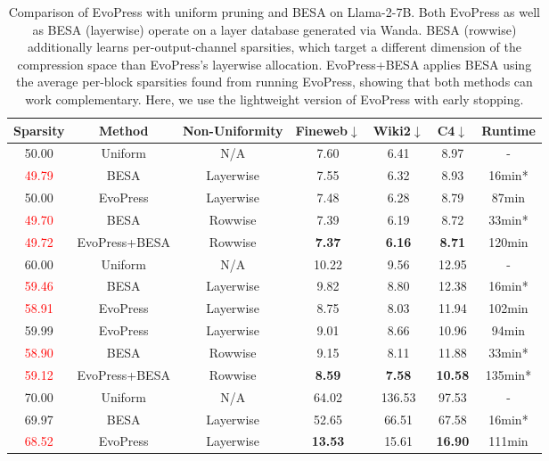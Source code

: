 

\begin{table}[h!]
\centering
\begin{threeparttable}

\caption{Comparison of EvoPress with uniform pruning and BESA on Llama-2-7B. Both EvoPress as well as BESA (layerwise) operate on a layer database generated via Wanda. BESA (rowwise) additionally learns per-output-channel sparsities, which target a different dimension of the compression space than EvoPress's layerwise allocation. EvoPress+BESA applies BESA using the average per-block sparsities found from running EvoPress, showing that both methods can work complementary. Here, we use the lightweight version of EvoPress with early stopping.}
\label{besa_comparison}
\begin{tabular}{ccc|ccc|c}
\toprule
\textbf{Sparsity} & \textbf{Method} & \textbf{Non-Uniformity} & \textbf{Fineweb$\downarrow$} & \textbf{Wiki2$\downarrow$} & \textbf{C4$\downarrow$} & \textbf{Runtime} \\
\midrule
50.00 & Uniform & N/A & 7.60 & 6.41 & 8.97 & - \\
\textcolor{red}{49.79} & BESA & Layerwise & 7.55 & 6.32 & 8.93 & 16min* \\
50.00 & EvoPress & Layerwise & 7.48 & 6.28 & 8.79 & 87min \\
\textcolor{red}{49.70} & BESA & Rowwise & 7.39 & 6.19 & 8.72 & 33min* \\
\textcolor{red}{49.72} & EvoPress+BESA & Rowwise & \textbf{7.37} & \textbf{6.16} & \textbf{8.71} & 120min \\
\midrule
60.00 & Uniform & N/A & 10.22 & 9.56 & 12.95 & - \\
\textcolor{red}{59.46} & BESA & Layerwise & 9.82 & 8.80 & 12.38 & 16min* \\
\textcolor{red}{58.91} & EvoPress & Layerwise & 8.75 & 8.03 & 11.94 & 102min \\
59.99 & EvoPress & Layerwise & 9.01 & 8.66 & 10.96 & 94min \\
\textcolor{red}{58.90} & BESA & Rowwise & 9.15 & 8.11 & 11.88 & 33min* \\
\textcolor{red}{59.12} & EvoPress+BESA & Rowwise & \textbf{8.59} & \textbf{7.58} & \textbf{10.58} & 135min* \\
\midrule
70.00 & Uniform & N/A & 64.02 & 136.53 & 97.53 & - \\
69.97 & BESA & Layerwise & 52.65 & 66.51 & 67.58 & 16min* \\
\textcolor{red}{68.52} & EvoPress & Layerwise & \textbf{13.53} & 15.61 & \textbf{16.90} & 111min \\

\end{tabular}
\end{threeparttable}
\end{table}
